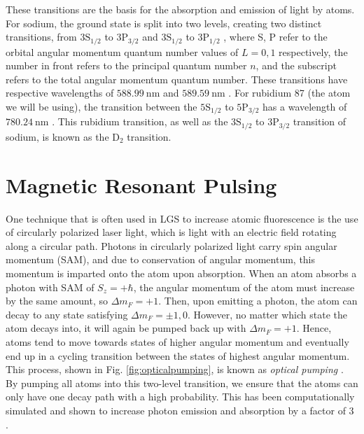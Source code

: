 These transitions are the basis for the absorption and emission of light by atoms. For sodium, the ground state is split into two levels, creating two distinct transitions, from $3\text{S}_{1/2}$ to $3\text{P}_{3/2}$ and $3\text{S}_{1/2}$ to $3\text{P}_{1/2}$ \cite{Kibblewhite2009}, where S, P refer to the orbital angular momentum quantum number values of $L = 0,1$ respectively, the number in front refers to the principal quantum number $n$, and the subscript refers to the total angular momentum quantum number. These transitions have respective wavelengths of $\SI{588.99}{\nano\meter}$ and $\SI{589.59}{\nano\meter}$ \cite{Kibblewhite2009}. For rubidium 87 (the atom we will be using), the transition between the $5\text{S}_{1/2}$ to $5\text{P}_{3/2}$ has a wavelength of $\SI{780.24}{\nano \meter}$ \cite{steck}. This rubidium transition, as well as the $3\text{S}_{1/2}$ to $3\text{P}_{3/2}$ transition of sodium, is known as the $\text{D}_2$ transition. 





\section{Magnetic Resonant Pulsing}


One technique that is often used in LGS to increase atomic fluorescence is the use of circularly polarized laser light, which is light with an electric field rotating along a circular path. Photons in circularly polarized light carry spin angular momentum (SAM), and due to conservation of angular momentum, this momentum is imparted onto the atom upon absorption. When an atom absorbs a photon with SAM of $S_z = + \hbar$, the angular momentum of the atom must increase by the same amount, so $\Delta m_F = + 1$. Then, upon emitting a photon, the atom can decay to any state satisfying $\Delta m_F = \pm 1, 0$. However, no matter which state the atom decays into, it will again be pumped back up with $\Delta m_F = +1$. Hence, atoms tend to move towards states of higher angular momentum and eventually end up in a cycling transition between the states of highest angular momentum. This process, shown in Fig. \ref{fig:opticalpumping}, is known as \textit{optical pumping} \cite{Kane2014}. By pumping all atoms into this two-level transition, we ensure that the atoms can only have one decay path with a high probability. This has been computationally simulated and shown to increase photon emission and absorption by a factor of 3 \cite{Kibblewhite2009}.

